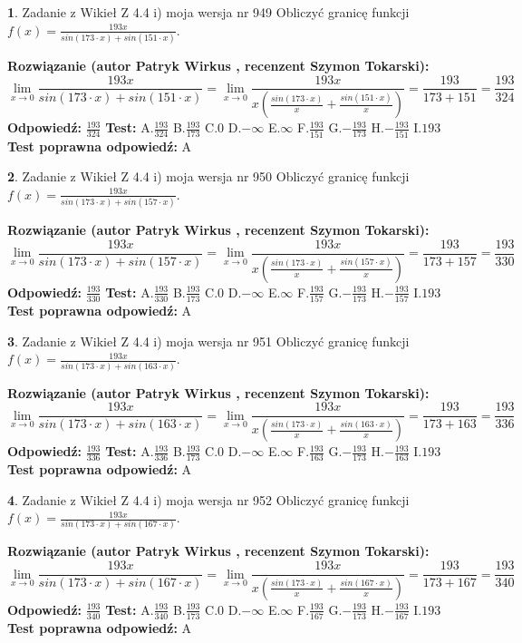 \documentclass[12pt, a4paper]{article}
\theoremstyle{definition} %
\newtheorem{zad}{}
\newcommand{\zadStart}[1]{\begin{zad}#1\newline}
\newcommand{\zadStop}{\end{zad}}
\newcommand{\rozwStart}[2]{\noindent \textbf{Rozwiązanie (autor #1 , recenzent #2): }\newline}
\newcommand{\rozwStop}{\newline}
\newcommand{\odpStart}{\noindent \textbf{Odpowiedź:}\newline}
\newcommand{\odpStop}{\newline}
\newcommand{\testStart}{\noindent \textbf{Test:}\newline}
\newcommand{\testStop}{\newline}
\newcommand{\kluczStart}{\noindent \textbf{Test poprawna odpowiedź:}\newline}
\newcommand{\kluczStop}{\newline}
\begin{document}
\zadStart{Zadanie z Wikieł Z 4.4 i) moja wersja nr 949}
Obliczyć granicę funkcji $f(x)=\frac{193x}{sin(173\cdot x) +sin(151\cdot x)}$.
\zadStop
\rozwStart{Patryk Wirkus}{Szymon Tokarski}
$$\lim\limits_{x\to 0}\frac{193x}{sin(173\cdot x) +sin(151\cdot x)}=\lim\limits_{x\to 0}\frac{193x}{x(\frac{sin(173\cdot x)}{x}+\frac{sin(151\cdot x)}{x})}=\frac{193}{173+151} = \frac{193}{324}$$
\rozwStop
\odpStart
$\frac{193}{324}$
\odpStop
\testStart
A.$\frac{193}{324}$
B.$\frac{193}{173}$
C.$0$
D.$-\infty$
E.$\infty$
F.$\frac{193}{151}$
G.$-\frac{193}{173}$
H.$-\frac{193}{151}$
I.$193$
\testStop
\kluczStart
A
\kluczStop



\zadStart{Zadanie z Wikieł Z 4.4 i) moja wersja nr 950}
Obliczyć granicę funkcji $f(x)=\frac{193x}{sin(173\cdot x) +sin(157\cdot x)}$.
\zadStop
\rozwStart{Patryk Wirkus}{Szymon Tokarski}
$$\lim\limits_{x\to 0}\frac{193x}{sin(173\cdot x) +sin(157\cdot x)}=\lim\limits_{x\to 0}\frac{193x}{x(\frac{sin(173\cdot x)}{x}+\frac{sin(157\cdot x)}{x})}=\frac{193}{173+157} = \frac{193}{330}$$
\rozwStop
\odpStart
$\frac{193}{330}$
\odpStop
\testStart
A.$\frac{193}{330}$
B.$\frac{193}{173}$
C.$0$
D.$-\infty$
E.$\infty$
F.$\frac{193}{157}$
G.$-\frac{193}{173}$
H.$-\frac{193}{157}$
I.$193$
\testStop
\kluczStart
A
\kluczStop



\zadStart{Zadanie z Wikieł Z 4.4 i) moja wersja nr 951}
Obliczyć granicę funkcji $f(x)=\frac{193x}{sin(173\cdot x) +sin(163\cdot x)}$.
\zadStop
\rozwStart{Patryk Wirkus}{Szymon Tokarski}
$$\lim\limits_{x\to 0}\frac{193x}{sin(173\cdot x) +sin(163\cdot x)}=\lim\limits_{x\to 0}\frac{193x}{x(\frac{sin(173\cdot x)}{x}+\frac{sin(163\cdot x)}{x})}=\frac{193}{173+163} = \frac{193}{336}$$
\rozwStop
\odpStart
$\frac{193}{336}$
\odpStop
\testStart
A.$\frac{193}{336}$
B.$\frac{193}{173}$
C.$0$
D.$-\infty$
E.$\infty$
F.$\frac{193}{163}$
G.$-\frac{193}{173}$
H.$-\frac{193}{163}$
I.$193$
\testStop
\kluczStart
A
\kluczStop



\zadStart{Zadanie z Wikieł Z 4.4 i) moja wersja nr 952}
Obliczyć granicę funkcji $f(x)=\frac{193x}{sin(173\cdot x) +sin(167\cdot x)}$.
\zadStop
\rozwStart{Patryk Wirkus}{Szymon Tokarski}
$$\lim\limits_{x\to 0}\frac{193x}{sin(173\cdot x) +sin(167\cdot x)}=\lim\limits_{x\to 0}\frac{193x}{x(\frac{sin(173\cdot x)}{x}+\frac{sin(167\cdot x)}{x})}=\frac{193}{173+167} = \frac{193}{340}$$
\rozwStop
\odpStart
$\frac{193}{340}$
\odpStop
\testStart
A.$\frac{193}{340}$
B.$\frac{193}{173}$
C.$0$
D.$-\infty$
E.$\infty$
F.$\frac{193}{167}$
G.$-\frac{193}{173}$
H.$-\frac{193}{167}$
I.$193$
\testStop
\kluczStart
A
\kluczStop
\end{document}
